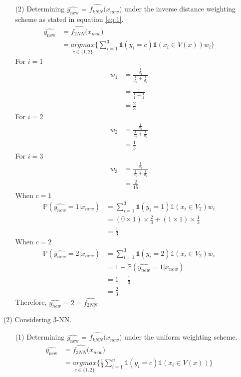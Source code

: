 \documentclass[12pt,a4paper]{article}
\begin{document}
\begin{enumerate}
\begin{enumerate}
	\item[(2)]Determining  $\widehat{y_{\text{new}}}$ = $\widehat{f_{kNN}(}x_{new})$  under the inverse distance weighting scheme as stated in equation \eqref{eq:1}.
\begin{align*}
		\widehat{y_{\text{new}}} &=  \widehat{f_{2NN}(}x_{new})\\		
		&= \underset{c \in \{1,2\}} {argmax}  \{  \sum_{i = 1}^3  \mathbb{1}(y_i  = c)   \mathbb{1}(x_i \in V(x)) w_i   \}
\end{align*}	
For $i=1$
\begin{align*}
  w_1  &=  \frac{  \frac{1}{d_1}  }{   \frac{1}{d_1}  + \frac{1}{d_2} }\\
  &=  \frac{  \frac{1}{1}  }{   \frac{1}{1}  + \frac{1}{2}  }\\
  &= \frac{2}{3}
\end{align*}
For $i=2$
\begin{align*}
  w_2  &=  \frac{  \frac{1}{d_2}  }{   \frac{1}{d_1}  + \frac{1}{d_2} }\\
  &= \frac{1}{3}
\end{align*}
For $i=3$
\begin{align*}
  w_3  &=  \frac{  \frac{1}{d_3}  }{   \frac{1}{d_1}  + \frac{1}{d_2} }\\
  &= \frac{2}{15}
\end{align*}
When $c = 1$
\begin{align*}
		\mathbb{P}(\widehat{y_{new}}  = 1 | x_{new}) &= \sum_{i = 1}^3  \mathbb{1}(y_i  = 1)   \mathbb{1}(x_i \in V_2) w_i \\
		&= (0 \times 1) \times \frac{2}{3} + (1 \times 1) \times \frac{1}{3}  \\
		&=  \frac{1}{3}
\end{align*}
When $c = 2$
\begin{align*}
		\mathbb{P}(\widehat{y_{new}}  = 2 | x_{new}) &= \sum_{i = 1}^3  \mathbb{1}(y_i  = 2)   \mathbb{1}(x_i \in V_2) w_i \\
		&=1 - \mathbb{P}(\widehat{y_{new}}  = 1 | x_{new})\\
		&=  1 -   \frac{1}{3}\\
 		&=  \frac{2}{3}
\end{align*}
Therefore, $ \widehat{y_{new}} = 2 =  \widehat{f_{2NN}} $ 

\end{enumerate}

\item[(2)] Considering 3-NN.
	\begin{enumerate}
			\item[(1)]Determining  $\widehat{y_{\text{new}}}$ = $\widehat{f_{kNN}(}x_{new})$  under the uniform weighting scheme.
			\begin{align*}
		\widehat{y_{\text{new}}} &=  \widehat{f_{3NN}(}x_{new})\\		
		&= \underset{c \in \{1,2\}} {argmax}  \{  \frac{1}{3} \sum_{i = 1}^n  \mathbb{1}(y_i  = c)   \mathbb{1}(x_i \in V(x))  \}
\end{align*}	


\end{enumerate}
\end{enumerate}
\end{document}
